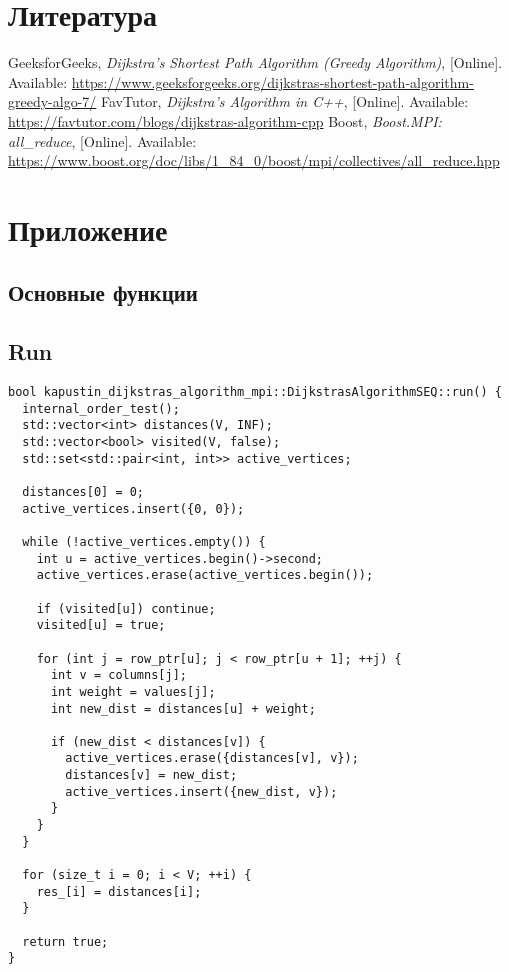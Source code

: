 \documentclass[a4paper,14pt]{extarticle}
\begin{document}
\section{Литература}
\begin{thebibliography}{9}
     GeeksforGeeks, \textit{Dijkstra’s Shortest Path Algorithm (Greedy Algorithm)}, [Online]. Available: \url{https://www.geeksforgeeks.org/dijkstras-shortest-path-algorithm-greedy-algo-7/}
     FavTutor, \textit{Dijkstra’s Algorithm in C++}, [Online]. Available: \url{https://favtutor.com/blogs/dijkstras-algorithm-cpp}
     Boost, \textit{Boost.MPI: all\_reduce}, [Online]. Available: \url{https://www.boost.org/doc/libs/1_84_0/boost/mpi/collectives/all_reduce.hpp}
\end{thebibliography}
\section*{Приложение}

\subsection*{Основные функции}

\subsection{Run}

\begin{lstlisting}[caption={Функция run последовательного алгоритма}]
bool kapustin_dijkstras_algorithm_mpi::DijkstrasAlgorithmSEQ::run() {
  internal_order_test();
  std::vector<int> distances(V, INF);
  std::vector<bool> visited(V, false);
  std::set<std::pair<int, int>> active_vertices;

  distances[0] = 0;
  active_vertices.insert({0, 0});

  while (!active_vertices.empty()) {
    int u = active_vertices.begin()->second;
    active_vertices.erase(active_vertices.begin());

    if (visited[u]) continue;
    visited[u] = true;

    for (int j = row_ptr[u]; j < row_ptr[u + 1]; ++j) {
      int v = columns[j];
      int weight = values[j];
      int new_dist = distances[u] + weight;

      if (new_dist < distances[v]) {
        active_vertices.erase({distances[v], v});
        distances[v] = new_dist;
        active_vertices.insert({new_dist, v});
      }
    }
  }

  for (size_t i = 0; i < V; ++i) {
    res_[i] = distances[i];
  }

  return true;
}
\end{lstlisting}
\clearpage
\end{document}
